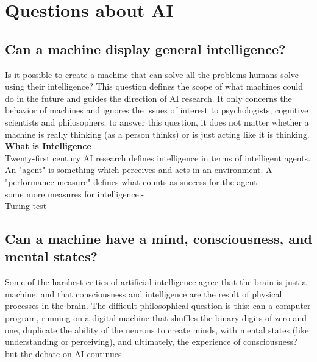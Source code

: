 \documentclass[12pt]{article}
\begin{document}
\section{Questions about AI}
\small\subsection{Can a machine display general intelligence?}
Is it possible to create a machine that can solve all the problems humans solve using their intelligence? This question defines the scope of what machines could do in the future and guides the direction of AI research. It only concerns the behavior of machines and ignores the issues of interest to psychologists, cognitive scientists and philosophers; to answer this question, it does not matter whether a machine is really thinking (as a person thinks) or is just acting like it is thinking.\\
\textbf{What is Intelligence}\\
Twenty-first century AI research defines intelligence in terms of intelligent agents. An "agent" is something which perceives and acts in an environment. A "performance measure" defines what counts as success for the agent.\\
some more measures for intelligence:-\\
\textcolor{blue}{\href{https://en.wikipedia.org/wiki/Turing_test}{Turing test}}\\
\subsection{Can a machine have a mind, consciousness, and mental states?}
 Some of the harshest critics of artificial intelligence agree that the brain is just a machine, and that consciousness and intelligence are the result of physical processes in the brain. The difficult philosophical question is this: can a computer program, running on a digital machine that shuffles the binary digits of zero and one, duplicate the ability of the neurons to create minds, with mental states (like understanding or perceiving), and ultimately, the experience of consciousness? but the debate on AI continues
\end{document}

